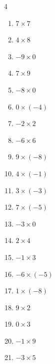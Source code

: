\begin{multicols}{4}
\begin{enumerate}
  \item $7\times 7$
        \phantom{$=49$}

  \item $4\times 8$
        \phantom{$=32$}

  \item $-9\times 0$
        \phantom{$=0$}

  \item $7\times 9$
        \phantom{$=63$}

  \item $-8\times 0$
        \phantom{$=0$}

  \item $0\times (-4)$
        \phantom{$=0$}

  \item $-2\times 2$
        \phantom{$=-4$}

  \item $-6\times 6$
        \phantom{$=-36$}

  \item $9\times (-8)$
        \phantom{$=-72$}

  \item $4\times (-1)$
        \phantom{$=-4$}

  \item $3\times (-3)$
        \phantom{$=-9$}

  \item $7\times (-5)$
        \phantom{$=-35$}

  \item $-3\times 0$
        \phantom{$=0$}

  \item $2\times 4$
        \phantom{$=8$}

  \item $-1\times 3$
        \phantom{$=-3$}

  \item $-6\times (-5)$
        \phantom{$=30$}

  \item $1\times (-8)$
        \phantom{$=-8$}

  \item $9\times 2$
        \phantom{$=18$}

  \item $0\times 3$
        \phantom{$=0$}

  \item $-1\times 9$
        \phantom{$=-9$}

  \item $-3\times 5$
        \phantom{$=-15$}


\end{enumerate}
\end{multicols}
